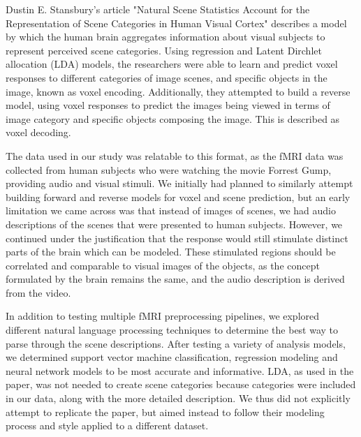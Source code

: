 \par Dustin E. Stansbury's article "Natural Scene Statistics Account for the Representation of 
Scene Categories in Human Visual Cortex" describes a model by which the human brain 
aggregates information about visual subjects to represent perceived scene categories. Using regression and Latent Dirchlet allocation (LDA) models, the researchers were able to learn and predict voxel responses to different categories of image scenes, and specific objects in the image, known as voxel encoding. Additionally, they attempted to build a reverse  model, using voxel responses to predict the images being viewed in terms of image category and specific objects composing the image. This is described as voxel decoding.

\par The data used in our study was relatable to this format, as the fMRI data was collected from human subjects who were watching the movie Forrest Gump, providing audio and visual stimuli. We initially had planned to similarly attempt building forward and reverse models for voxel and scene prediction, but an early limitation we came across was that instead of images of scenes, we had audio descriptions of the scenes that were presented to 
human subjects. However, we continued under the justification that the response would still stimulate distinct parts of the brain which can be modeled. These stimulated regions should be correlated and comparable to visual images of the objects, as the concept formulated by the brain remains the same, and the audio description is derived from the video. 

\par In addition to testing multiple fMRI preprocessing pipelines, we explored different natural language processing techniques to determine the best way to parse through the scene descriptions. After testing a variety of analysis models, we determined support vector machine classification, regression modeling and neural network models to be most accurate and informative. LDA, as used in the paper, was not needed to create scene categories because categories were included in our data, along with the more detailed description. We thus did not explicitly attempt to replicate the paper, but aimed instead to follow their modeling process and style applied to a different dataset.
